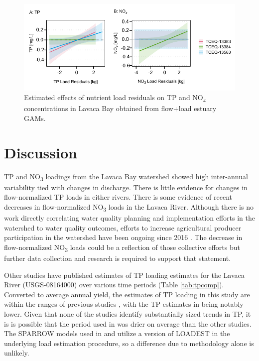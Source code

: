 \documentclass[water,article,submit,oneauthor]{Definitions/mdpi}
\begin{document}
\begin{figure}

{\centering \includegraphics[width=1\linewidth]{Schramm-Manuscript-2023_files/figure-latex/fig7-1} 

}

\caption[Estimated effects of nutrient load residuals on TP and NO\textsubscript{\emph{x}} concentrations in Lavaca Bay obtained from flow+load estuary GAMs]{Estimated effects of nutrient load residuals on TP and NO\textsubscript{\emph{x}} concentrations in Lavaca Bay obtained from flow+load estuary GAMs.}\label{fig:fig7}
\end{figure}

\hypertarget{discussion}{%
\section{Discussion}\label{discussion}}

TP and NO\textsubscript{3} loadings from the Lavaca Bay watershed showed
high inter-annual variability tied with changes in discharge. There is
little evidence for changes in flow-normalized TP loads in either
rivers. There is some evidence of recent decreases in flow-normalized
NO\textsubscript{3} loads in the Lavaca River. Although there is no work
directly correlating water quality planning and implementation efforts
in the watershed to water quality outcomes, efforts to increase
agricultural producer participation in the watershed have been ongoing
since 2016
\citep{schramm_lavaca_2018, bertholdDirectMailingEducation2021}. The
decrease in flow-normalized NO\textsubscript{3} loads could be a
reflection of those collective efforts but further data collection and
research is required to support that statement.

Other studies have published estimates of TP loading estimates for the
Lavaca River (USGS-08164000) over various time periods (Table
\ref{tab:tpcomp}). Converted to average annual yield, the estimates of
TP loading in this study are within the ranges of previous studies
\citep{dunnTrendsNutrientInflows1996, rebich_sources_2011, omaniEstimationSedimentNutrient2014, wise_spatially_2019},
with the TP estimates in \citet{dunnTrendsNutrientInflows1996} being
notably lower. Given that none of the studies identify substantially
sized trends in TP, it is is possible that the period used in
\citet{dunnTrendsNutrientInflows1996} was drier on average than the
other studies. The SPARROW models used in \citet{rebich_sources_2011}
and \citet{wise_spatially_2019} utilize a version of LOADEST in the
underlying load estimation procedure, so a difference due to methodology
alone is unlikely.
\end{document}
